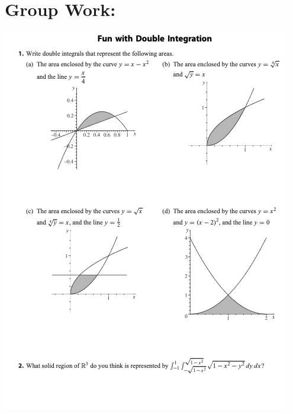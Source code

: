 \pagebreak

\section*{Group Work:}

\includegraphics[height=.9\textheight]{Fun-with-Double-Integration.png}



